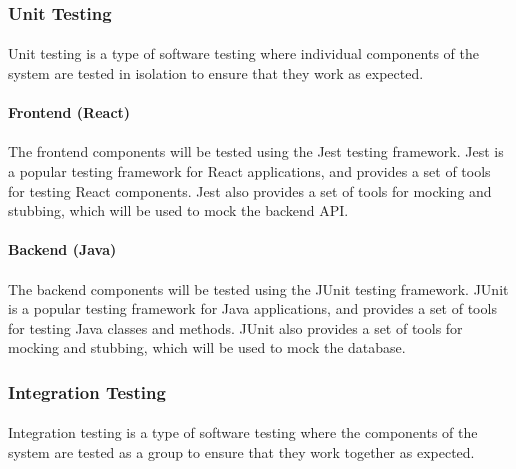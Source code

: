 \documentclass{article}
\begin{document}
\subsubsection{Unit Testing}
\paragraph*{}
Unit testing is a type of software testing where individual components of the system are tested in isolation to ensure that they work as expected.

\paragraph*{Frontend (React)}
\paragraph*{}
The frontend components will be tested using the Jest testing framework. Jest is a popular testing framework for React applications, and provides a set of tools for testing React components. Jest also provides a set of tools for mocking and stubbing, which will be used to mock the backend API.

\paragraph*{Backend (Java)}
\paragraph*{}
The backend components will be tested using the JUnit testing framework. JUnit is a popular testing framework for Java applications, and provides a set of tools for testing Java classes and methods. JUnit also provides a set of tools for mocking and stubbing, which will be used to mock the database.

\subsubsection{Integration Testing}
\paragraph*{}
Integration testing is a type of software testing where the components of the system are tested as a group to ensure that they work together as expected.
\end{document}

